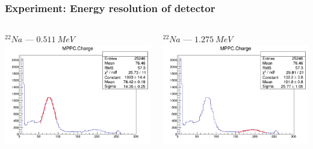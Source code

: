 \documentclass[11pt]{beamer}
\begin{document}
\begin{frame}
    \frametitle{Experiment: Energy resolution of detector}
    \begin{columns}
        \begin{column}{0.5\textwidth}
            $^{22}Na$ --- $0.511~MeV$\\
            \includegraphics[width=1\textwidth]{figures/setup3.png}
            
        \end{column}
                \begin{column}{0.5\textwidth}
                    $^{22}Na$ --- $1.275~MeV$\\
            \includegraphics[width=1\textwidth]{figures/setup4.png}
        \end{column}
    \end{columns} 
    

\end{frame}
\end{document}
